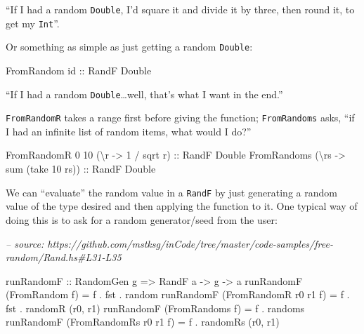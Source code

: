 \documentclass[]{article}
\newenvironment{Shaded}{}{}
\newcommand{\CommentTok}[1]{\textcolor[rgb]{0.38,0.63,0.69}{\textit{#1}}}
\newcommand{\DataTypeTok}[1]{\textcolor[rgb]{0.56,0.13,0.00}{#1}}
\newcommand{\DecValTok}[1]{\textcolor[rgb]{0.25,0.63,0.44}{#1}}
\newcommand{\FunctionTok}[1]{\textcolor[rgb]{0.02,0.16,0.49}{#1}}
\newcommand{\NormalTok}[1]{#1}
\newcommand{\OtherTok}[1]{\textcolor[rgb]{0.00,0.44,0.13}{#1}}
\begin{document}
``If I had a random \texttt{Double}, I'd square it and divide it by three, then
round it, to get my \texttt{Int}''.

Or something as simple as just getting a random \texttt{Double}:

\begin{Shaded}
\begin{Highlighting}[]
\DataTypeTok{FromRandom}\OtherTok{ id ::} \DataTypeTok{RandF} \DataTypeTok{Double}
\end{Highlighting}
\end{Shaded}

``If I had a random \texttt{Double}\ldots{}well, that's what I want in the
end.''

\texttt{FromRandomR} takes a range first before giving the function;
\texttt{FromRandoms} asks, ``if I had an infinite list of random items, what
would I do?''

\begin{Shaded}
\begin{Highlighting}[]
\DataTypeTok{FromRandomR} \DecValTok{0} \DecValTok{10}\NormalTok{ (\textbackslash{}r }\OtherTok{->} \DecValTok{1} \FunctionTok{/}\NormalTok{ sqrt r)}\OtherTok{ ::} \DataTypeTok{RandF} \DataTypeTok{Double}
\DataTypeTok{FromRandoms}\NormalTok{ (\textbackslash{}rs }\OtherTok{->}\NormalTok{ sum (take }\DecValTok{10}\NormalTok{ rs))}\OtherTok{ ::} \DataTypeTok{RandF} \DataTypeTok{Double}
\end{Highlighting}
\end{Shaded}

We can ``evaluate'' the random value in a \texttt{RandF} by just generating a
random value of the type desired and then applying the function to it. One
typical way of doing this is to ask for a random generator/seed from the user:

\begin{Shaded}
\begin{Highlighting}[]
\CommentTok{-- source: https://github.com/mstksg/inCode/tree/master/code-samples/free-random/Rand.hs#L31-L35}

\OtherTok{runRandomF ::} \DataTypeTok{RandomGen}\NormalTok{ g }\OtherTok{=>} \DataTypeTok{RandF}\NormalTok{ a }\OtherTok{->}\NormalTok{ g }\OtherTok{->}\NormalTok{ a}
\NormalTok{runRandomF (}\DataTypeTok{FromRandom}\NormalTok{ f)         }\FunctionTok{=}\NormalTok{ f }\FunctionTok{.}\NormalTok{ fst }\FunctionTok{.}\NormalTok{ random}
\NormalTok{runRandomF (}\DataTypeTok{FromRandomR}\NormalTok{ r0 r1 f)  }\FunctionTok{=}\NormalTok{ f }\FunctionTok{.}\NormalTok{ fst }\FunctionTok{.}\NormalTok{ randomR (r0, r1)}
\NormalTok{runRandomF (}\DataTypeTok{FromRandoms}\NormalTok{ f)        }\FunctionTok{=}\NormalTok{ f }\FunctionTok{.}\NormalTok{ randoms}
\NormalTok{runRandomF (}\DataTypeTok{FromRandomRs}\NormalTok{ r0 r1 f) }\FunctionTok{=}\NormalTok{ f }\FunctionTok{.}\NormalTok{ randomRs (r0, r1)}
\end{Highlighting}
\end{Shaded}
\end{document}
